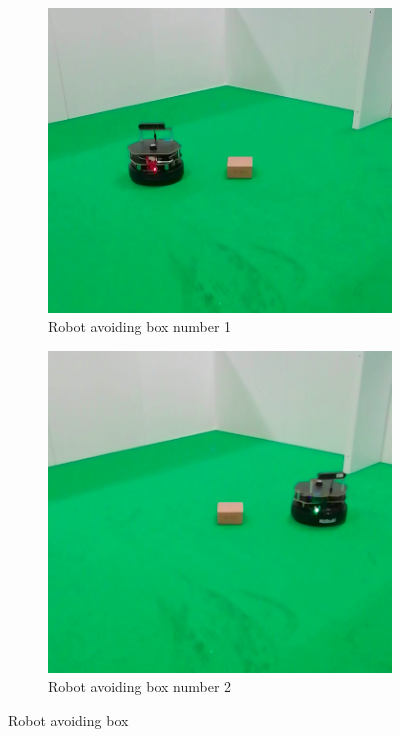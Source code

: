\begin{figure}[h!]
  \centering
  \begin{subfigure}[b]{0.49\linewidth}
    \includegraphics[width=\linewidth]{imgs/chapter5/boxRS.png}
     \caption{Robot avoiding box number 1}
     \label{fig::wchair}
  \end{subfigure}
  \begin{subfigure}[b]{0.49\linewidth}
    \includegraphics[width=\linewidth]{imgs/chapter5/boxRS2.png}
    \caption{Robot avoiding box  number 2}
    \label{fig::nchair}
  \end{subfigure}
  \caption{Robot avoiding box}
  \label{fig:boxRS}
\end{figure}

